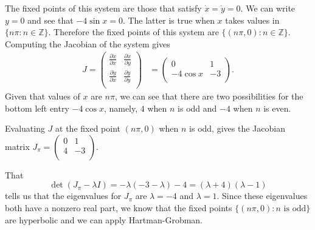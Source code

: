 \documentclass[10pt]{article}
\newcommand*{\px}[2]{\tfrac{\partial\dot #1}{\partial #2}}
\begin{document}
\begin{enumerate}
        The fixed points of this system are those that satisfy
        $\dot x = \dot y = 0$. We can write $y = 0$ and see that
        $-4\sin x = 0$. The latter is true when $x$ takes values in
        $\{n\pi : n \in \mathbb{Z}\}$. Therefore the fixed points of this
        system are $\{(n\pi,0) : n \in \mathbb{Z}\}$.
        Computing the Jacobian of the system gives
        \begin{align*}
          J = \begin{pmatrix}
            \px{x}{x} & \px{x}{y} \\
            \px{y}{x} & \px{y}{y} \\
          \end{pmatrix} &=
          \begin{pmatrix}
            0 & 1 \\
            -4\cos x & -3 \\
          \end{pmatrix}.
        \end{align*}
      Given that values of $x$ are $n\pi$, we can see that there are two
      possibilities for the bottom left entry $-4\cos x$, namely, $4$ when
      $n$ is odd and $-4$ when $n$ is even.

      Evaluating $J$ at the fixed point $(n\pi,0)$ when $n$ is odd, gives the
      Jacobian matrix
        $
          J_\pi = \begin{pmatrix}
            0 & 1 \\
            4 & -3 \\
          \end{pmatrix}
        $.

        That 
        $$\det(J_\pi - \lambda I) = -\lambda(-3-\lambda) - 4 = (\lambda + 4)(\lambda - 1)$$
        tells us that the eigenvalues for $J_\pi$ are $\lambda
        = -4$ and $\lambda = 1$. Since these eigenvalues both have a nonzero
        real part, we know that the fixed points $\{(n\pi,0):n\text{ is odd}\}$ are
        hyperbolic and we can apply Hartman-Grobman.


\end{enumerate}
\end{document}

